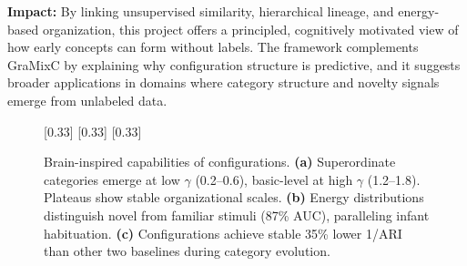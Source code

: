 \textbf{Impact:}
By linking unsupervised similarity, hierarchical lineage, and energy-based organization, this project offers a principled, cognitively motivated view of how early concepts can form without labels. The framework complements GraMixC by explaining why configuration structure is predictive, and it suggests broader applications in domains where category structure and novelty signals emerge from unlabeled data.

\begin{figure}[ht]
  \centering
  [0.33\linewidth]{}
  [0.33\linewidth]{}
  \hspace{-1em}
  [0.33\linewidth]{}
  \caption{
    Brain-inspired capabilities of configurations.
    \textbf{(a)} Superordinate categories emerge at low $\gamma$ (0.2--0.6), basic-level at high $\gamma$ (1.2--1.8). Plateaus show stable organizational scales.
    \textbf{(b)} Energy distributions distinguish novel from familiar stimuli (87\% AUC), paralleling infant habituation.
    \textbf{(c)} Configurations achieve stable 35\% lower 1/ARI than other two baselines during category evolution.
  }
  \label{fig:04}
\end{figure}